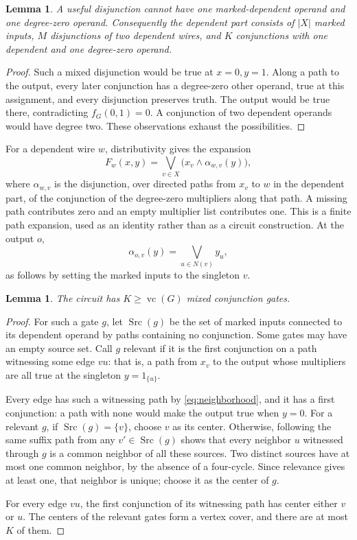 \documentclass[11pt]{article}
\newcommand{\vc}{\operatorname{vc}}
\newtheorem{lemma}[theorem]{Lemma}
\theoremstyle{definition}
\theoremstyle{remark}
\begin{document}
\begin{lemma}\label{lem:normal}
A useful disjunction cannot have one marked-dependent operand and one degree-zero operand. Consequently the dependent part consists of $|X|$ marked inputs, $M$ disjunctions of two dependent wires, and $K$ conjunctions with one dependent and one degree-zero operand.
\end{lemma}
\begin{proof}
Such a mixed disjunction would be true at $x=0,y=1$. Along a path to the output, every later conjunction has a degree-zero other operand, true at this assignment, and every disjunction preserves truth. The output would be true there, contradicting $f_G(0,1)=0$. A conjunction of two dependent operands would have degree two. These observations exhaust the possibilities.
\end{proof}

For a dependent wire $w$, distributivity gives the expansion
\[
 F_w(x,y)=\bigvee_{v\in X}\bigl(x_v\wedge\alpha_{w,v}(y)\bigr),
\]
where $\alpha_{w,v}$ is the disjunction, over directed paths from $x_v$ to $w$ in the dependent part, of the conjunction of the degree-zero multipliers along that path. A missing path contributes zero and an empty multiplier list contributes one. This is a finite path expansion, used as an identity rather than as a circuit construction. At the output $o$,
\[
 \alpha_{o,v}(y)=\bigvee_{u\in N(v)}y_u,                 \tag{\thesection.1}\label{eq:neighborhood}
\]
as follows by setting the marked inputs to the singleton $v$.

\begin{lemma}\label{lem:centers}
The circuit has $K\ge\vc(G)$ mixed conjunction gates.
\end{lemma}
\begin{proof}
For such a gate $g$, let $\operatorname{Src}(g)$ be the set of marked inputs connected to its dependent operand by paths containing no conjunction. Some gates may have an empty source set. Call $g$ relevant if it is the first conjunction on a path witnessing some edge $vu$: that is, a path from $x_v$ to the output whose multipliers are all true at the singleton $y=1_{\{u\}}$.

Every edge has such a witnessing path by \eqref{eq:neighborhood}, and it has a first conjunction: a path with none would make the output true when $y=0$. For a relevant $g$, if $\operatorname{Src}(g)=\{v\}$, choose $v$ as its center. Otherwise, following the same suffix path from any $v'\in\operatorname{Src}(g)$ shows that every neighbor $u$ witnessed through $g$ is a common neighbor of all these sources. Two distinct sources have at most one common neighbor, by the absence of a four-cycle. Since relevance gives at least one, that neighbor is unique; choose it as the center of $g$.

For every edge $vu$, the first conjunction of its witnessing path has center either $v$ or $u$. The centers of the relevant gates form a vertex cover, and there are at most $K$ of them.
\end{proof}
\end{document}
